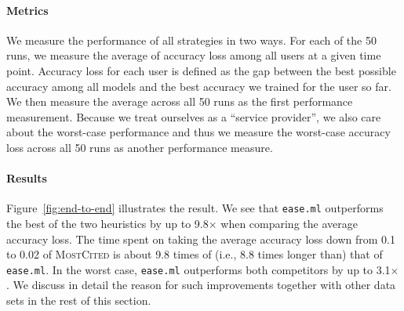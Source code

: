 \documentclass[letterpaper]{vldb}
\newcommand{\eml}{\texttt{ease.ml}\xspace}
\begin{document}
\vspace{-1em}
\paragraph*{Metrics} We measure the performance
of all strategies in two ways.
For each of the 50 runs, we
measure the average of accuracy loss
among all users at a given time
point. Accuracy loss for each user
is defined as the gap between
the best possible accuracy among all
models and the best accuracy we
trained for the user so far. We
then measure the average across
all 50 runs as the first performance
measurement. Because
we treat ourselves as a ``service provider'',
we also care about the worst-case
performance and thus we measure the
worst-case accuracy loss 
across all 50 runs as another performance
measure.

\vspace{-1em}
\paragraph*{Results} Figure~\ref{fig:end-to-end}
illustrates the result.
We see that \eml outperforms the best of the two heuristics by up to 9.8$\times$ when comparing the average accuracy loss. The time spent on taking the average accuracy loss down from 0.1 to 0.02 of \textsc{MostCited} is about 9.8 times of (i.e., 8.8 times longer than) that of \eml.
In the worst case, \eml outperforms 
both competitors by up to 3.1$\times$.
We discuss in detail the reason for
such improvements together with other data
sets in the rest of this section.
\end{document}
